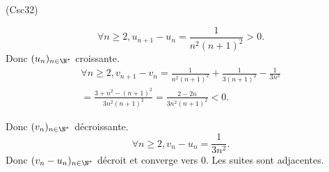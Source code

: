 \begin{tiny}(Csc32)\end{tiny}
\[
  \forall n \geq 2, 
  u_{n+1} - u_n = \frac{1}{n^2(n+1)^2} > 0.
\]
Donc $(u_n)_{n\in \N^*}$ croissante.
\begin{multline*}
  \forall n \geq 2, 
  v_{n+1} - v_n = \frac{1}{n^2(n+1)^2} + \frac{1}{3(n+1)^2} - \frac{1}{3n^2}\\
  = \frac{3 + n^2 - (n+1)^2}{3 n^2(n+1)^2}
  = \frac{2 - 2n}{3 n^2(n+1)^2} < 0.
\end{multline*}

Donc $(v_n)_{n\in \N^*}$ décroissante.
\[
  \forall n \geq 2, v_n - u_n = \frac{1}{3n^2}.
\]
Donc $(v_n - u_n)_{n\in \N^*}$ décroit et converge vers $0$. Les suites sont adjacentes.
